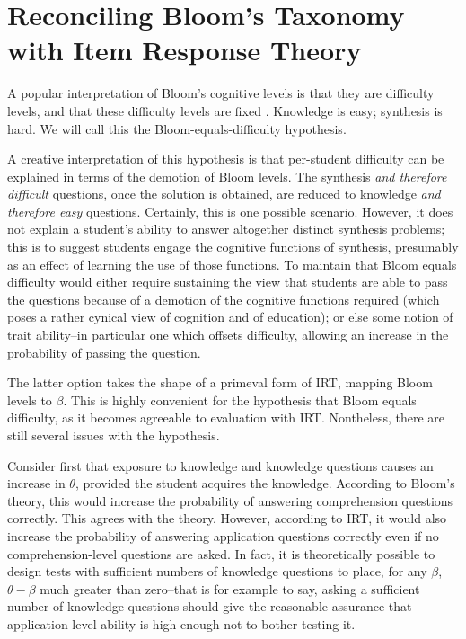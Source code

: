 
\section{Reconciling Bloom's Taxonomy with Item Response Theory}

A popular interpretation of Bloom's cognitive levels is that they are
difficulty levels, and that these difficulty levels are fixed
\cite{newman1988effect,oliver2004course,lord2007moving,
johnson2006bloom,fuller2007developing}.  Knowledge is easy; synthesis is hard.
We will call this the Bloom-equals-difficulty hypothesis.

A creative interpretation of this hypothesis is that per-student difficulty can
be explained in terms of the demotion of Bloom levels.  The synthesis \emph{and
therefore difficult} questions, once the solution is obtained, are reduced to
knowledge \emph{and therefore easy} questions.  Certainly, this is one possible
scenario.  However, it does not explain a student's ability to answer
altogether distinct synthesis problems; this is to suggest students engage the
cognitive functions of synthesis, presumably as an effect of learning the use
of those functions.  To maintain that Bloom equals difficulty would either
require sustaining the view that students are able to pass the questions
because of a demotion of the cognitive functions required (which poses a rather
cynical view of cognition and of education); or else some notion of trait
ability--in particular one which offsets difficulty, allowing an increase in
the probability of passing the question.

The latter option takes the shape of a primeval form of IRT, mapping Bloom
levels to $\beta$.  This is highly convenient for the hypothesis that Bloom
equals difficulty, as it becomes agreeable to evaluation with IRT.  Nontheless,
there are still several issues with the hypothesis.

Consider first that exposure to knowledge and knowledge questions causes an
increase in $\theta$, provided the student acquires the knowledge.  According
to Bloom's theory, this would increase the probability of answering
comprehension questions correctly.  This agrees with the theory.  However,
according to IRT, it would also increase the probability of answering
application questions correctly even if no comprehension-level questions are
asked.  In fact, it is theoretically possible to design tests with sufficient
numbers of knowledge questions to place, for any $\beta$, $\theta-\beta$ much
greater than zero--that is for example to say, asking a sufficient number of
knowledge questions should give the reasonable assurance that application-level
ability is high enough not to bother testing it.

